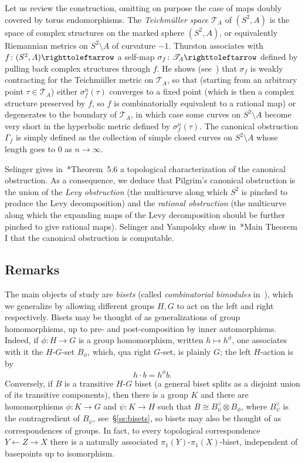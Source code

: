 \documentclass{amsart}
\begin{document}
Let us review the construction, omitting on purpose the case of maps
doubly covered by torus endomorphisms. The \emph{Teichm\"uller space}
$\mathscr T_A$ of $(S^2,A)$ is the space of complex structures on the
marked sphere $(S^2,A)$, or equivalently Riemannian metrics on
$S^2\setminus A$ of curvature $-1$. Thurston associates with
$f\colon(S^2,A)\selfmap$ a self-map
$\sigma_f\colon\mathscr T_A\selfmap$ defined by pulling back complex
structures through $f$. He shows (see~\cite{douady-h:thurston}) that
$\sigma_f$ is weakly contracting for the Teichm\"uller metric on
$\mathscr T_A$, so that (starting from an arbitrary point
$\tau\in\mathscr T_A$) either $\sigma_f^n(\tau)$ converges to a fixed
point (which is then a complex structure preserved by $f$, so $f$ is
combinatorially equivalent to a rational map) or degenerates to the
boundary of $\mathscr T_A$, in which case some curves on
$S^2\setminus A$ become very short in the hyperbolic metric defined by
$\sigma_f^n(\tau)$. The canonical obstruction $\Gamma_f$ is simply
defined as the collection of simple closed curves on $S^2\setminus A$
whose length goes to $0$ as $n\to\infty$.

Selinger gives in~\cite{selinger:canonical}*{Theorem~5.6} a topological
characterization of the canonical obstruction. As a consequence, we
deduce that Pilgrim's canonical obstruction is the union of the
\emph{Levy obstruction} (the multicurve along which $S^2$ is pinched
to produce the Levy decomposition) and the \emph{rational obstruction}
(the multicurve along which the expanding maps of the Levy
decomposition should be further pinched to give rational maps).
Selinger and Yampolsky show
in~\cite{selinger-yampolsky:geometrization}*{Main Theorem I} that the
canonical obstruction is computable.

\subsection{Remarks}
The main objects of study are \emph{bisets} (called
\emph{combinatorial bimodules} in~\cite{nekrashevych:ssg}), which we
generalize by allowing different groups $H,G$ to act on the left
and right respectively. Bisets may be thought of as generalizations of
group homomorphisms, up to pre- and post-composition by inner
automorphisms.  Indeed, if $\phi\colon H\to G$ is a group
homomorphism, written $h\mapsto h^\phi$, one associates with it the
$H$-$G$-set $B_\phi$, which, qua right $G$-set, is plainly $G$; the
left $H$-action is by
\[h\cdot b=h^\phi b.
\]
Conversely, if $B$ is a transitive $H$-$G$ biset (a general biset
splits as a disjoint union of its transitive components), then there
is a group $K$ and there are homomorphisms $\phi\colon K\to G$ and
$\psi \colon K\to H$ such that $B\cong B_\psi^{\vee}\otimes B_\phi$,
where $ B_\psi^{\vee}$ is the contragredient of $ B_\psi$,
see~\S\ref{ss:bisets}, so bisets may also be thought of
as correspondences of groups. In fact, to every topological
correspondence $Y\leftarrow Z\to X$ there is a naturally associated
$\pi_1(Y)$-$\pi_1(X)$-biset, independent of basepoints up to
isomorphism.
\end{document}
